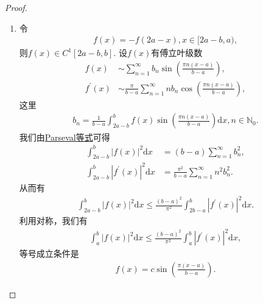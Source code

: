 \documentclass[../../main.tex]{subfiles}
\begin{document}
\begin{proof}
\begin{enumerate}[(1)]
\item 令
\begin{align*}
f(x)=-f(2a - x), x\in[2a - b,a),
\end{align*}
则$f(x)\in C^1[2a - b,b]$.
设$f(x)$有傅立叶级数
\begin{align*}
f(x) &\sim \sum_{n = 1}^{\infty}b_n\sin\left(\frac{\pi n(x - a)}{b - a}\right),\\
f^{\prime}(x) &\sim \frac{\pi}{b - a}\sum_{n = 1}^{\infty}nb_n\cos\left(\frac{\pi n(x - a)}{b - a}\right),
\end{align*}
这里
\begin{align*}
b_n=\frac{1}{b - a}\int_{2a - b}^{b}f(x)\sin\left(\frac{\pi n(x - a)}{b - a}\right)\mathrm{d}x, n\in\mathbb{N}_0.
\end{align*}
我们由\hyperref[theorem:Parseval等式]{Parseval等式}可得
\begin{align*}
\int_{2a - b}^{b}|f(x)|^2\mathrm{d}x&=(b - a)\sum_{n = 1}^{\infty}b_n^2,\\
\int_{2a - b}^{b}|f^{\prime}(x)|^2\mathrm{d}x&=\frac{\pi^2}{b - a}\sum_{n = 1}^{\infty}n^2b_n^2.
\end{align*}
从而有
\begin{align*}
\int_{2a - b}^{b}|f(x)|^2\mathrm{d}x\leq\frac{(b - a)^2}{\pi^2}\int_{2b - a}^{b}|f^{\prime}(x)|^2\mathrm{d}x.
\end{align*}
利用对称，我们有
\begin{align*}
\int_{a}^{b}|f(x)|^2\mathrm{d}x\leq\frac{(b - a)^2}{\pi^2}\int_{a}^{b}|f^{\prime}(x)|^2\mathrm{d}x,
\end{align*}
等号成立条件是
\begin{align*}
f(x)=c\sin\left(\frac{\pi(x - a)}{b - a}\right).
\end{align*} 
\end{enumerate}
\end{proof}
\end{document}
